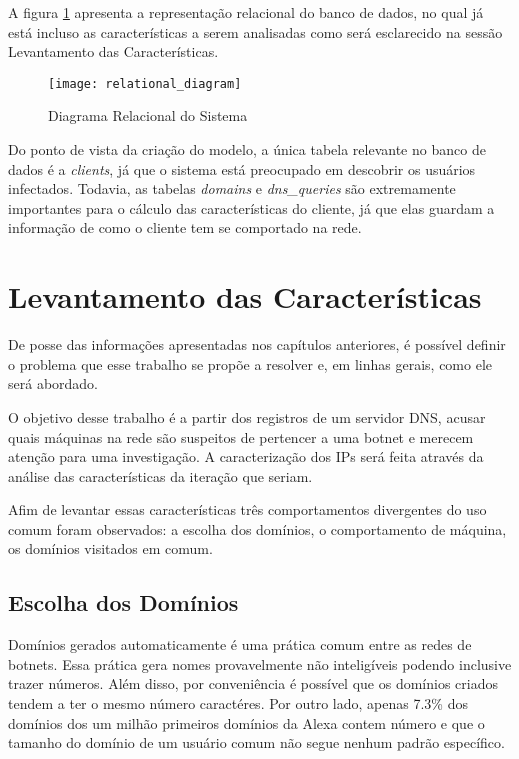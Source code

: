A figura \ref{fig:relational_diagram} apresenta a representação relacional do banco de dados, no qual já está incluso as características a serem analisadas como será esclarecido na sessão Levantamento das Características.

\begin{figure}
\texttt{[image: relational\_diagram]}
\caption[Diagrama Relacional do Sistema]{Diagrama Relacional do Sistema} \label{fig:relational_diagram}
\end{figure}

Do ponto de vista da criação do modelo, a única tabela relevante no banco de dados é a \textit{clients}, já que o sistema está preocupado em descobrir os usuários infectados. Todavia, as tabelas \textit{domains} e \textit{dns\_queries} são extremamente importantes para o cálculo das características do cliente, já que elas guardam a informação de como o cliente tem se comportado na rede.

\section{Levantamento das Características}
De posse das informações apresentadas nos capítulos anteriores, é possível definir o problema que esse trabalho se propõe a resolver e, em linhas gerais, como ele será abordado.

O objetivo desse trabalho é a partir dos registros de um servidor DNS, acusar quais máquinas na rede são suspeitos de pertencer a uma botnet e merecem atenção para uma investigação. A caracterização dos IPs será feita através da análise das características da iteração que seriam.

Afim de levantar essas características três comportamentos divergentes do uso comum foram observados: a escolha dos domínios, o comportamento de máquina, os domínios visitados em comum.

\subsection{Escolha dos Domínios}
Domínios gerados automaticamente é uma prática comum entre as redes de botnets. Essa prática gera nomes provavelmente não inteligíveis podendo inclusive trazer números. Além disso, por conveniência é possível que os domínios criados tendem a ter o mesmo número caractéres. Por outro lado, apenas 7.3\% dos domínios dos um milhão primeiros domínios da Alexa contem número e que o tamanho do domínio de um usuário comum não segue nenhum padrão específico.

